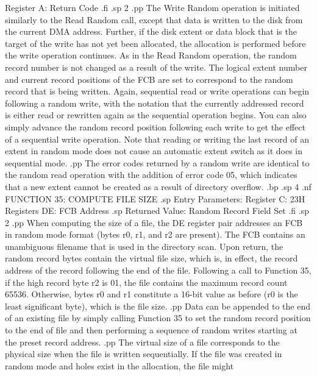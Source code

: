                      Register  A:  Return Code
.fi
.sp 2
.pp
The Write Random operation is initiated similarly to the Read 
Random call, except that data is written to the disk from the 
current DMA address.  Further, if the disk extent or data block 
that is the target of the write has not yet been allocated, the 
allocation is performed before the write operation continues.  As 
in the Read Random operation, the random record number is not 
changed as a result of the write.  The logical extent number and 
current record positions of the FCB are set to correspond to the 
random record that is being written.  Again, sequential read or 
write operations can begin following a random write, with the 
notation that the currently addressed record is either read or 
rewritten again as the sequential operation begins.  You can 
also simply advance the random record position following each 
write to get the effect of a sequential write operation.  
Note that reading or writing the last record of an extent in 
random mode does not cause an automatic extent switch as it does 
in sequential mode.
.pp
The error codes returned by a random write are identical to the 
random read operation with the addition of error code 05, which 
indicates that a new extent cannot be created as a result of 
directory overflow.
.bp
.sp 4
.nf
                 FUNCTION 35:  COMPUTE FILE SIZE
.sp
                  Entry Parameters:
                        Register C:  23H
                      Registers DE:  FCB Address
.sp
                  Returned Value:
                      Random Record Field Set
.fi
.sp 2
.pp
When computing the size of a file, the DE register pair addresses 
an FCB in random mode format (bytes r0, r1, and r2 are present).  
The FCB contains an unambiguous filename that is used in the 
directory scan.  Upon return, the random record bytes contain the 
virtual file size, which is, in effect, the record address of 
the record following the end of the file.  Following a call to 
Function 35, if the high record byte r2 is 01, the file contains 
the maximum record count 65536.  Otherwise, bytes r0 and r1 
constitute a 16-bit value as before (r0 is the least significant byte), 
which is the file size.
.pp
Data can be appended to the end of an existing file by simply 
calling Function 35 to set the random record position to the end 
of file and then performing a sequence of random writes starting 
at the preset record address.
.pp
The virtual size of a file corresponds to the physical size when 
the file is written sequentially.  If the file was created in 
random mode and holes exist in the allocation, the file might 
